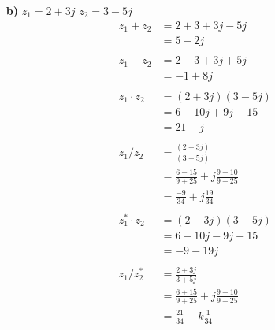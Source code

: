 \documentclass[a4paper,11pt]{article}
\begin{document}
\begin{enumerate}
\begin{enumerate}
\begin{enumerate}
			\item[\textbf{b)}] $z_1 = 2+3j$ $z_2=3-5j$			
			\begin{align*}
			z_1+z_2 &= 2+3+3j-5j \\
					&= 5-2j \\\\
			z_1-z_2 &= 2-3+3j+5j \\
					&= -1+8j \\\\
			z_1 \cdot z_2 &= (2+3j)(3-5j) \\
			              &= 6-10j+9j+15 \\
			              &= 21-j \\\\
			z_1 / z_2 &= \frac{(2+3j)}{(3-5j)} \\
			          &= \frac{6-15}{9+25}+j\frac{9+10}{9+25} \\
			          &= \frac{-9}{34}+j\frac{19}{34} \\\\
			z_1^* \cdot z_2 &= (2-3j)(3-5j) \\
			              	&= 6-10j-9j-15 \\
			              	&= -9-19j \\\\
			z_1 / z_2^* &= \frac{2+3j}{3+5j}\\
						&= \frac{6+15}{9+25} + j\frac{9-10}{9+25} \\
						&= \frac{21}{34}-k\frac{1}{34}
			\end{align*}
			

\end{enumerate}
\end{enumerate}
\end{enumerate}
\end{document}
